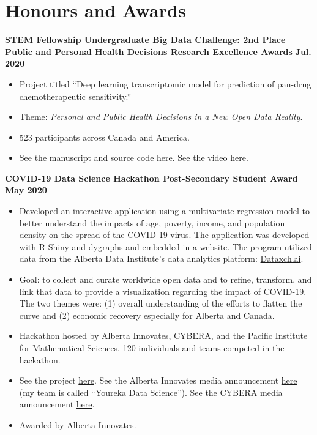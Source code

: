 \documentclass{article}
\begin{document}
\section*{\textcolor{my_red}{Honours and Awards}}
\textbf{STEM Fellowship Undergraduate Big Data Challenge: 2nd Place Public and Personal Health Decisions Research Excellence Awards} \hfill \textbf{Jul. 2020}
\begin{itemize}
    \item Project titled ``Deep learning transcriptomic model for prediction of pan-drug chemotherapeutic sensitivity.''
    \item Theme: \textit{Personal and Public Health Decisions in a New Open Data Reality}.
    \item 523 participants across Canada and America.
    \item See the manuscript and source code \href{https://github.com/tig3r66/youreka_genes}{here}. See the video \href{https://youtu.be/MTOuXgh4zqU}{here}.
\end{itemize}
    \textbf{COVID-19 Data Science Hackathon Post-Secondary Student Award} \hfill \textbf{May 2020}
    \begin{itemize}
        \item Developed an interactive application using a multivariate regression model to better understand the impacts of age, poverty, income, and population density on the spread of the COVID-19 virus. The application was developed with R Shiny and dygraphs and embedded in a website. The program utilized data from the Alberta Data Institute's data analytics platform: \href{https://dataxch.ai}{Dataxch.ai}.
        \item Goal: to collect and curate worldwide open data and to refine, transform, and link that data to provide a visualization regarding the impact of COVID-19. The two themes were: (1) overall understanding of the efforts to flatten the curve and (2) economic recovery especially for Alberta and Canada.
        \item Hackathon hosted by Alberta Innovates, CYBERA, and the Pacific Institute for Mathematical Sciences. 120 individuals and teams competed in the hackathon.
        \item See the project \href{https://yourekacanada.org/index}{here}. See the Alberta Innovates media announcement \href{https://albertainnovates.ca/impact/newsroom/flattening-the-curve-and-promoting-economic-recovery-through-innovation}{here} (my team is called ``Youreka Data Science''). See the CYBERA media announcement \href{https://www.cybera.ca/news-and-events/news/covid-19-data-science-hackathon-winners/}{here}.
        \item Awarded by Alberta Innovates.
    \end{itemize}
\end{document}
